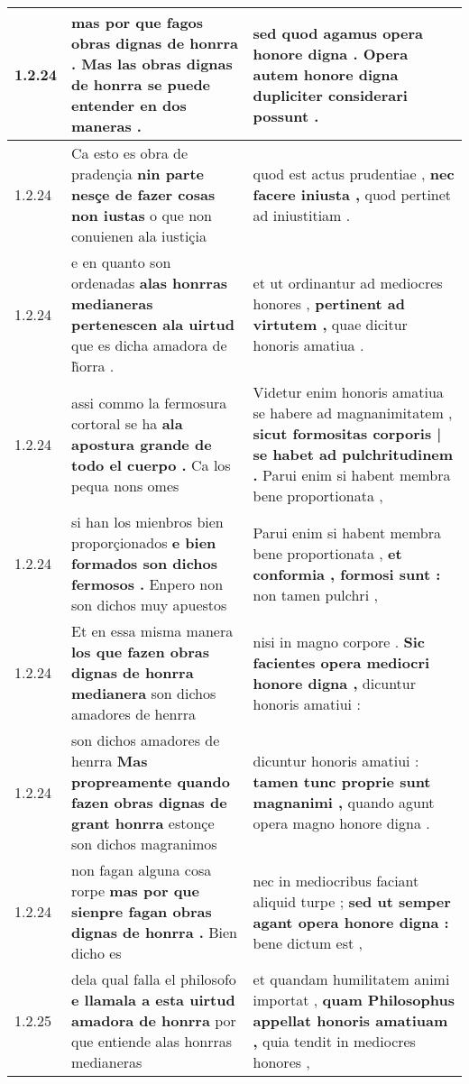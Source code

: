 \begin{tabular}{|p{1cm}|p{6.5cm}|p{6.5cm}|}
1.2.24 & mas por que fagos obras dignas de honrra . \textbf{ Mas las obras dignas de honrra } se puede entender en dos maneras . & sed quod agamus opera honore digna . \textbf{ Opera autem honore digna } dupliciter considerari possunt . \\\hline
1.2.24 & Ca esto es obra de pradençia \textbf{ nin parte nesçe de fazer cosas non iustas } o que non conuienen ala iustiçia & quod est actus prudentiae , \textbf{ nec facere iniusta , } quod pertinet ad iniustitiam . \\\hline
1.2.24 & e en quanto son ordenadas \textbf{ alas honrras medianeras pertenescen ala uirtud } que es dicha amadora de h̃orra . & et ut ordinantur ad mediocres honores , \textbf{ pertinent ad virtutem , } quae dicitur honoris amatiua . \\\hline
1.2.24 & assi commo la fermosura cortoral se ha \textbf{ ala apostura grande de todo el cuerpo . } Ca los pequa nons omes & Videtur enim honoris amatiua se habere ad magnanimitatem , \textbf{ sicut formositas corporis | se habet ad pulchritudinem . } Parui enim si habent membra bene proportionata , \\\hline
1.2.24 & si han los mienbros bien proporçionados \textbf{ e bien formados son dichos fermosos . } Enpero non son dichos muy apuestos & Parui enim si habent membra bene proportionata , \textbf{ et conformia , formosi sunt : } non tamen pulchri , \\\hline
1.2.24 & Et en essa misma manera \textbf{ los que fazen obras dignas de honrra medianera } son dichos amadores de henrra & nisi in magno corpore . \textbf{ Sic facientes opera mediocri honore digna , } dicuntur honoris amatiui : \\\hline
1.2.24 & son dichos amadores de henrra \textbf{ Mas propreamente quando fazen obras dignas de grant honrra } estonçe son dichos magranimos & dicuntur honoris amatiui : \textbf{ tamen tunc proprie sunt magnanimi , } quando agunt opera magno honore digna . \\\hline
1.2.24 & non fagan alguna cosa rorpe \textbf{ mas por que sienpre fagan obras dignas de honrra . } Bien dicho es & nec in mediocribus faciant aliquid turpe ; \textbf{ sed ut semper agant opera honore digna : } bene dictum est , \\\hline
1.2.25 & dela qual falla el philosofo \textbf{ e llamala a esta uirtud amadora de honrra } por que entiende alas honrras medianeras & et quandam humilitatem animi importat , \textbf{ quam Philosophus appellat honoris amatiuam , } quia tendit in mediocres honores , \\\hline

\end{tabular}
